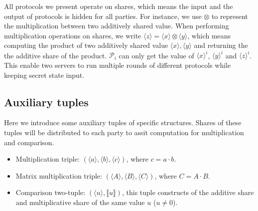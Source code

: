 \documentclass[letterpaper]{article} %
\begin{document}
    All protocols we present operate on shares, which means 
    the input and the output of protocols is hidden for all parties.
    For instance, we use $\otimes$ to represent the multiplication between two additively shared value.   
    When performing multiplication operations on shares, 
    we write $\langle z\rangle=\langle x\rangle\otimes  \langle y\rangle $,
    which means computing the product of two additively shared value $\langle x\rangle, \langle y\rangle$ and returning the 
    the additive share of the product. 
    $\mathcal{P}_{i}$ can only get the value of $\langle x\rangle ^{i}$, $\langle y\rangle ^{i}$ and $\langle z\rangle ^{i}$.
    This enable two servers to run multiple rounds of different protocols
    while keeping secret state input.

    \subsection{Auxiliary tuples}
    Here we introduce some auxiliary tuples of specific structures. 
    Shares of these tuples will be distributed to each party to 
    assit computation for multiplication and comparison. 
    \begin{itemize}
        \item Multiplication triple: $(\langle a\rangle,\langle b\rangle,\langle c\rangle)$, where $c=a\cdot b$.
        \item Matrix multiplication triple: $(\langle A\rangle,\langle B\rangle,\langle C\rangle)$, where $C=A\cdot B$.
        \item Comparison two-tuple: $(\langle u\rangle,\llbracket u \rrbracket)$, 
        this tuple constructs of the additive share and multiplicative share of the same value $u$ ($u\neq 0 $).
    \end{itemize}
    
    
\end{document}
